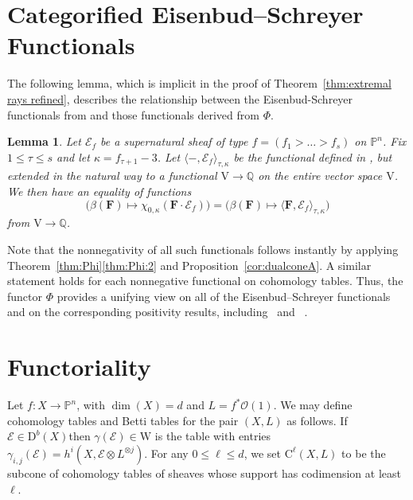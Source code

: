 \documentclass[12pt]{amsart}
\newtheorem{lemma}{Lemma}[section]
\theoremstyle{definition}
\theoremstyle{remark}
\newcommand{\PP}{\mathbb{P}}
\newcommand{\QQ}{\mathbb{Q}}
\newcommand{\VV}{\mathrm{V}}
\newcommand{\WW}{\mathrm{W}}
\newcommand{\cO}{\mathcal{O}}
\newcommand{\cE}{\mathcal{E}}
\newcommand{\FF}{\mathbf{F}}
\newcommand{\DD}{\mathrm{D}}
\newcommand{\CQ}{\mathrm{C}}
\begin{document}
\section{Categorified Eisenbud--Schreyer Functionals}\label{sec:functionals}
The following lemma, which is implicit in the  proof of Theorem~\ref{thm:extremal rays refined}, describes the relationship between the Eisenbud-Schreyer functionals from \cites{eis-schrey1, eis-schrey-icm} and those functionals derived from $\Phi$.
\begin{lemma}\label{lem:tau kappa}
Let $\cE_{f}$ be a supernatural sheaf of type $f=(f_1>\dots>f_s)$ on $\PP^n$.  Fix $1\leq \tau \leq s$ and let $\kappa=f_{\tau+1}-3$.  Let $\langle -, \cE_{f}\rangle_{\tau,\kappa}$ be the functional defined in \cite{eis-schrey-icm}, but extended in the natural way to a functional $\VV\to \QQ$ on the entire vector space $\VV$.  
We then have an equality of functions
\[
\bigg( \beta(\FF)\mapsto \chi_{0,\kappa}(\FF\cdot \cE_f)\bigg) =\bigg( \beta(\FF)\mapsto \langle \FF, \cE_f\rangle_{\tau,\kappa} \bigg)\]
from $\VV \to \QQ$.
\end{lemma}

Note that the nonnegativity of all such functionals follows instantly by applying Theorem~\ref{thm:Phi}\eqref{thm:Phi:2} and Proposition~\ref{cor:dualconeA}.  A similar statement holds for each nonnegative functional on cohomology tables.  Thus, the functor $\Phi$ provides a unifying view on all of the Eisenbud--Schreyer functionals and on the corresponding positivity results, including~\cite[Positivity 1]{eis-schrey-icm} and~ \cite[Positivity 2]{eis-schrey-icm}.




\section{Functoriality}\label{sec:functor}
Let $f: X\to \PP^n$, with $\dim(X)=d$ and $L=f^*\cO(1)$.  We may define cohomology tables and Betti tables for the pair $(X,L)$ as follows.  If $\cE\in \DD^b(X)$then $\gamma(\cE)\in \WW$ is the table with entries $\gamma_{i,j}(\cE)=h^i(X,\cE\otimes L^{\otimes j})$.  For any $0\leq \ell \leq d$, we set $\CQ^{\ell}(X,L)$ to be the subcone of cohomology tables of sheaves whose support has codimension at least $\ell$.
\end{document}
